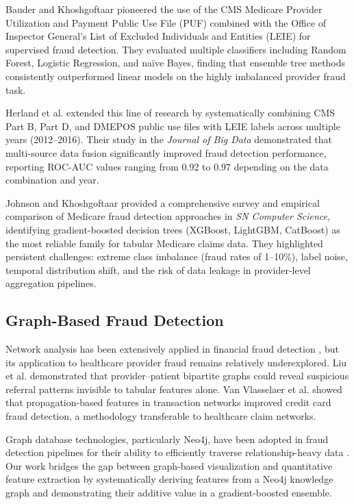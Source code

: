 \documentclass[conference]{IEEEtran}
\begin{document}
Bauder and Khoshgoftaar \cite{bauder2017} pioneered the use of the CMS Medicare Provider Utilization and Payment Public Use File (PUF) combined with the Office of Inspector General's List of Excluded Individuals and Entities (LEIE) for supervised fraud detection. They evaluated multiple classifiers including Random Forest, Logistic Regression, and na\"ive Bayes, finding that ensemble tree methods consistently outperformed linear models on the highly imbalanced provider fraud task.

Herland et al. \cite{herland2018} extended this line of research by systematically combining CMS Part B, Part D, and DMEPOS public use files with LEIE labels across multiple years (2012--2016). Their study in the \textit{Journal of Big Data} demonstrated that multi-source data fusion significantly improved fraud detection performance, reporting ROC-AUC values ranging from 0.92 to 0.97 depending on the data combination and year.

Johnson and Khoshgoftaar \cite{johnson2023} provided a comprehensive survey and empirical comparison of Medicare fraud detection approaches in \textit{SN Computer Science}, identifying gradient-boosted decision trees (XGBoost, LightGBM, CatBoost) as the most reliable family for tabular Medicare claims data. They highlighted persistent challenges: extreme class imbalance (fraud rates of 1--10\%), label noise, temporal distribution shift, and the risk of data leakage in provider-level aggregation pipelines.

\subsection{Graph-Based Fraud Detection}

Network analysis has been extensively applied in financial fraud detection \cite{pourhabibi2020}, but its application to healthcare provider fraud remains relatively underexplored. Liu et al. \cite{liu2021} demonstrated that provider--patient bipartite graphs could reveal suspicious referral patterns invisible to tabular features alone. Van Vlasselaer et al. \cite{vanvlasselaer2017} showed that propagation-based features in transaction networks improved credit card fraud detection, a methodology transferable to healthcare claim networks.

Graph database technologies, particularly Neo4j, have been adopted in fraud detection pipelines for their ability to efficiently traverse relationship-heavy data \cite{neo4j2023}. Our work bridges the gap between graph-based visualization and quantitative feature extraction by systematically deriving features from a Neo4j knowledge graph and demonstrating their additive value in a gradient-boosted ensemble.
\end{document}
